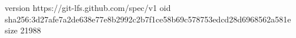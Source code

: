 version https://git-lfs.github.com/spec/v1
oid sha256:3d27afe7a2de638e77e8b2992c2b7f1ce58b69c578753edcd28d6968562a581e
size 21988
